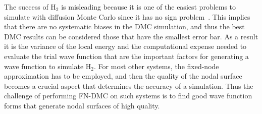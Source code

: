 \documentclass[aip,jcp,numerical,reprint]{revtex4-1}
\begin{document}
The success of H$_{2}$ is misleading because it is one of the easiest problems to simulate with diffusion Monte Carlo since it has no sign problem~\cite{Tubman_Release}.  This implies that there are no systematic biases in the DMC simulation, and thus the best DMC results can be considered those that have the smallest error bar.  As a result it is the variance of the local energy and the computational expense needed to evaluate the trial wave function that are the important factors for generating a wave function to simulate H$_{2}$.  For most other systems, the fixed-node approximation has to be employed, and then the quality of the nodal surface becomes a crucial aspect that determines the accuracy of a simulation.  Thus the challenge of performing FN-DMC on such systems is to find good wave function forms that generate nodal surfaces of high quality.

\end{document}
